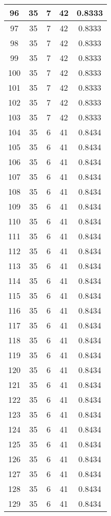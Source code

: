 \documentclass[letterpaper, 12pt]{article}
\begin{document}
\begin{longtable}{|c|c|c|c|c|}
\hline
96 & 35 & 7 & 42 & 0.8333 \\
\hline
97 & 35 & 7 & 42 & 0.8333 \\
\hline
98 & 35 & 7 & 42 & 0.8333 \\
\hline
99 & 35 & 7 & 42 & 0.8333 \\
\hline
100 & 35 & 7 & 42 & 0.8333 \\
\hline
101 & 35 & 7 & 42 & 0.8333 \\
\hline
102 & 35 & 7 & 42 & 0.8333 \\
\hline
103 & 35 & 7 & 42 & 0.8333 \\
\hline
104 & 35 & 6 & 41 & 0.8434 \\
\hline
105 & 35 & 6 & 41 & 0.8434 \\
\hline
106 & 35 & 6 & 41 & 0.8434 \\
\hline
107 & 35 & 6 & 41 & 0.8434 \\
\hline
108 & 35 & 6 & 41 & 0.8434 \\
\hline
109 & 35 & 6 & 41 & 0.8434 \\
\hline
110 & 35 & 6 & 41 & 0.8434 \\
\hline
111 & 35 & 6 & 41 & 0.8434 \\
\hline
112 & 35 & 6 & 41 & 0.8434 \\
\hline
113 & 35 & 6 & 41 & 0.8434 \\
\hline
114 & 35 & 6 & 41 & 0.8434 \\
\hline
115 & 35 & 6 & 41 & 0.8434 \\
\hline
116 & 35 & 6 & 41 & 0.8434 \\
\hline
117 & 35 & 6 & 41 & 0.8434 \\
\hline
118 & 35 & 6 & 41 & 0.8434 \\
\hline
119 & 35 & 6 & 41 & 0.8434 \\
\hline
120 & 35 & 6 & 41 & 0.8434 \\
\hline
121 & 35 & 6 & 41 & 0.8434 \\
\hline
122 & 35 & 6 & 41 & 0.8434 \\
\hline
123 & 35 & 6 & 41 & 0.8434 \\
\hline
124 & 35 & 6 & 41 & 0.8434 \\
\hline
125 & 35 & 6 & 41 & 0.8434 \\
\hline
126 & 35 & 6 & 41 & 0.8434 \\
\hline
127 & 35 & 6 & 41 & 0.8434 \\
\hline
128 & 35 & 6 & 41 & 0.8434 \\
\hline
129 & 35 & 6 & 41 & 0.8434 \\

\end{longtable}
\end{document}
